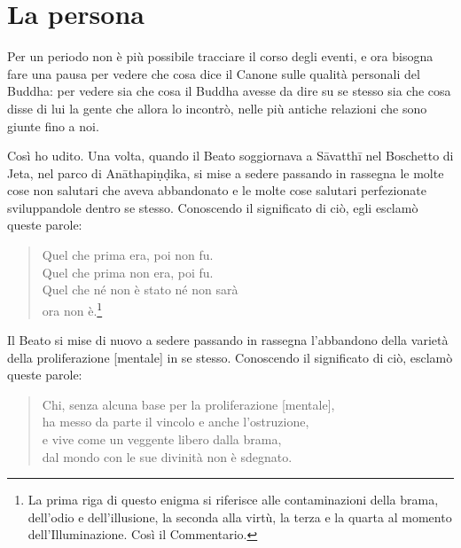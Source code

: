 \chapter{La persona}

 Per un periodo non è più possibile tracciare il
corso degli eventi, e ora bisogna fare una pausa per vedere che cosa dice il
Canone sulle qualità personali del Buddha: per vedere sia che cosa il Buddha
avesse da dire su se stesso sia che cosa disse di lui la gente che allora lo
incontrò, nelle più antiche relazioni che sono giunte fino a noi.

 Così ho udito. Una volta, quando il Beato soggiornava a
Sāvatthī nel Boschetto di Jeta, nel parco di Anāthapiṇḍika, si mise a sedere
passando in rassegna le molte cose non salutari che aveva abbandonato e le molte
cose salutari perfezionate sviluppandole dentro se stesso. Conoscendo il
significato di ciò, egli esclamò queste parole:

\begin{quote}
Quel che prima era, poi non fu. \\
Quel che prima non era, poi fu. \\
Quel che né non è stato né non sarà \\
ora non è.\footnote{La prima riga di questo enigma si riferisce alle contaminazioni della brama, dell’odio e dell’illusione, la seconda alla virtù, la terza e la quarta al momento dell’Illuminazione. Così il Commentario.}
\end{quote}


Il Beato si mise di nuovo a sedere passando in rassegna l’abbandono della
varietà della proliferazione [mentale]
in se stesso. Conoscendo il significato di ciò, esclamò queste parole:

\begin{quote}
Chi, senza alcuna base per la proliferazione [mentale], \\
ha messo da parte il vincolo e anche l’ostruzione, \\
e vive come un veggente libero dalla brama, \\
dal mondo con le sue divinità non è sdegnato.
\end{quote}

